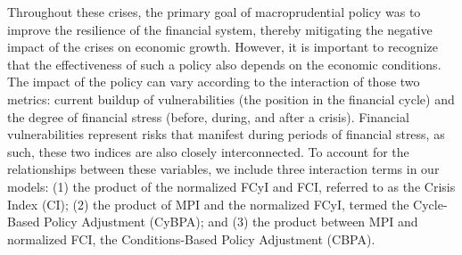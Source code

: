 Throughout these crises, the primary goal of macroprudential policy was to improve the resilience of the financial system, thereby mitigating the negative impact of the crises on economic growth. However, it is important to recognize that the effectiveness of such a policy also depends on the economic conditions. The impact of the policy can vary according to the interaction of those two metrics: current buildup of vulnerabilities (the position in the financial cycle) and the degree of financial stress (before, during, and after a crisis). Financial vulnerabilities represent risks that manifest during periods of financial stress, as such, these two indices are also closely interconnected. To account for the relationships between these variables, we include three interaction terms in our models: (1) the product of the normalized FCyI and FCI, referred to as the Crisis Index (CI); (2) the product of MPI and the normalized FCyI, termed the Cycle-Based Policy Adjustment (CyBPA); and (3) the product between MPI and normalized FCI, the Conditions-Based Policy Adjustment (CBPA).
